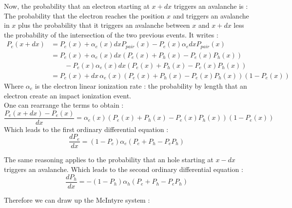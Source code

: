 \documentclass[10pt,a4paper,twocolumn]{article}
\begin{document}
Now, the probability that an electron starting at $x+dx$ triggers an avalanche is :
The probability that the electron reaches the position $x$ and triggers an avalanche in $x$ plus the probability that it triggers an avalanche between $x$ and $x+dx$ less the probability of the intersection of the two previous events. It writes : 
\begin{align*}
P_e(x+dx) &= P_e(x) + \alpha_e(x) dx P_{pair}(x)  - P_e(x)  \alpha_e dx P_{pair}(x) \\
		  &= P_e(x) + \alpha_e(x) dx (P_e(x) + P_h(x) - P_e(x) P_h(x)) \\& \qquad - P_e(x) \alpha_e(x) dx (P_e(x) + P_h(x) - P_e(x) P_h(x)) \\
		  &=  P_e(x) + dx \, \alpha_e(x) (P_e(x) + P_h(x) - P_e(x) P_h(x)) (1 - P_e(x))
\end{align*}
Where $\alpha_e$ is the electron linear ionization rate : the probability by length that an electron create an impact ionization event.  \\
One can rearrange the terms to obtain : 
\[ \frac{P_e(x+dx)-P_e(x)}{dx} = \alpha_e(x) (P_e(x) + P_h(x) - P_e(x) P_h(x)) (1 - P_e(x)) \]
Which leads to the first ordinary differential equation : 
\[ \frac{dP_e}{dx} = (1-P_e)\alpha_e(P_e + P_h - P_e  P_h) \]

The same reasoning applies to the probability that an hole starting at $x-dx$ triggers an avalanche.
Which leads to the second ordinary differential equation : 
\[ \frac{dP_h}{dx} = -(1-P_h)\alpha_h(P_e + P_h - P_e  P_h) \]

Therefore we can draw up the McIntyre system : 
\end{document}
